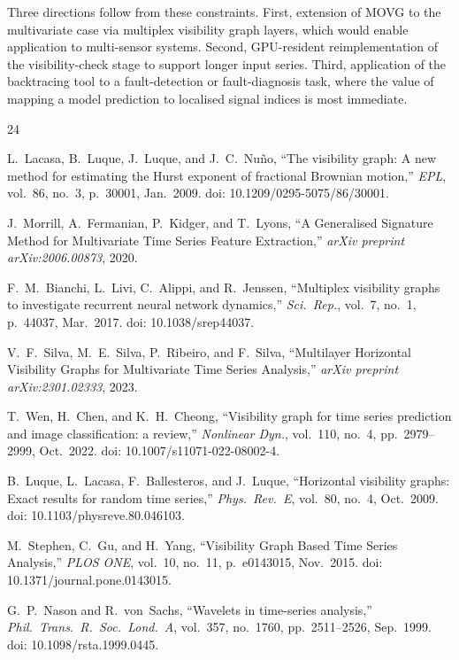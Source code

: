 \documentclass[a4paper,12pt]{article}
\begin{document}
Three directions follow from these constraints. First, extension of MOVG to the multivariate case via multiplex visibility graph layers, which would enable application to multi-sensor systems. Second, GPU-resident reimplementation of the visibility-check stage to support longer input series. Third, application of the backtracing tool to a fault-detection or fault-diagnosis task, where the value of mapping a model prediction to localised signal indices is most immediate.

\begin{thebibliography}{24}

 L.~Lacasa, B.~Luque, J.~Luque, and J.~C.~Nu\~no, ``The visibility graph: A new method for estimating the Hurst exponent of fractional Brownian motion,'' \textit{EPL}, vol.~86, no.~3, p.~30001, Jan.~2009. doi: 10.1209/0295-5075/86/30001.

 J.~Morrill, A.~Fermanian, P.~Kidger, and T.~Lyons, ``A Generalised Signature Method for Multivariate Time Series Feature Extraction,'' \textit{arXiv preprint arXiv:2006.00873}, 2020.

 F.~M.~Bianchi, L.~Livi, C.~Alippi, and R.~Jenssen, ``Multiplex visibility graphs to investigate recurrent neural network dynamics,'' \textit{Sci.\ Rep.}, vol.~7, no.~1, p.~44037, Mar.~2017. doi: 10.1038/srep44037.

 V.~F.~Silva, M.~E.~Silva, P.~Ribeiro, and F.~Silva, ``Multilayer Horizontal Visibility Graphs for Multivariate Time Series Analysis,'' \textit{arXiv preprint arXiv:2301.02333}, 2023.

 T.~Wen, H.~Chen, and K.~H.~Cheong, ``Visibility graph for time series prediction and image classification: a review,'' \textit{Nonlinear Dyn.}, vol.~110, no.~4, pp.~2979--2999, Oct.~2022. doi: 10.1007/s11071-022-08002-4.

 B.~Luque, L.~Lacasa, F.~Ballesteros, and J.~Luque, ``Horizontal visibility graphs: Exact results for random time series,'' \textit{Phys.\ Rev.\ E}, vol.~80, no.~4, Oct.~2009. doi: 10.1103/physreve.80.046103.

 M.~Stephen, C.~Gu, and H.~Yang, ``Visibility Graph Based Time Series Analysis,'' \textit{PLOS ONE}, vol.~10, no.~11, p.~e0143015, Nov.~2015. doi: 10.1371/journal.pone.0143015.

 G.~P.~Nason and R.~von~Sachs, ``Wavelets in time-series analysis,'' \textit{Phil.\ Trans.\ R.\ Soc.\ Lond.\ A}, vol.~357, no.~1760, pp.~2511--2526, Sep.~1999. doi: 10.1098/rsta.1999.0445.


\end{thebibliography}
\end{document}
